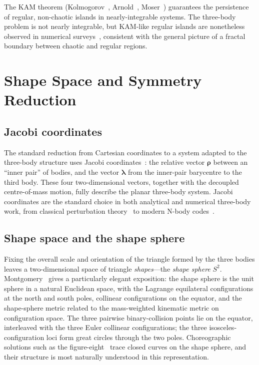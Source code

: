 \documentclass[11pt,a4paper]{article}
\begin{document}
The KAM theorem (Kolmogorov~\cite{kolmogorov1954}, Arnold~\cite{arnold1963},
Moser~\cite{moser1962}) guarantees the persistence of regular, non-chaotic islands in
nearly-integrable systems.  The three-body problem is not nearly integrable, but KAM-like
regular islands are nonetheless observed in numerical surveys~\cite{trani2024}, consistent with
the general picture of a fractal boundary between chaotic and regular regions.

\section{Shape Space and Symmetry Reduction}

\subsection{Jacobi coordinates}

The standard reduction from Cartesian coordinates to a system adapted to the three-body
structure uses Jacobi coordinates~\cite{jacobi1842}: the relative vector $\boldsymbol{\rho}$
between an ``inner pair'' of bodies, and the vector $\boldsymbol{\lambda}$ from the inner-pair
barycentre to the third body.  These four two-dimensional vectors, together with the decoupled
centre-of-mass motion, fully describe the planar three-body system.  Jacobi coordinates are
the standard choice in both analytical and numerical three-body work, from classical perturbation
theory~\cite{poincare1892} to modern N-body codes~\cite{rein2012}.

\subsection{Shape space and the shape sphere}

Fixing the overall scale and orientation of the triangle formed by the three bodies leaves a
two-dimensional space of triangle \emph{shapes}---the \emph{shape sphere} $S^2$.
Montgomery~\cite{montgomery2015} gives a particularly elegant exposition: the shape sphere is
the unit sphere in a natural Euclidean space, with the Lagrange equilateral configurations at
the north and south poles, collinear configurations on the equator, and the shape-sphere metric
related to the mass-weighted kinematic metric on configuration space.  The three pairwise
binary-collision points lie on the equator, interleaved with the three Euler collinear
configurations; the three isosceles-configuration loci form great circles through the two
poles.  Choreographic solutions such as the figure-eight~\cite{chenciner2000} trace closed
curves on the shape sphere, and their structure is most naturally understood in this
representation.
\end{document}

